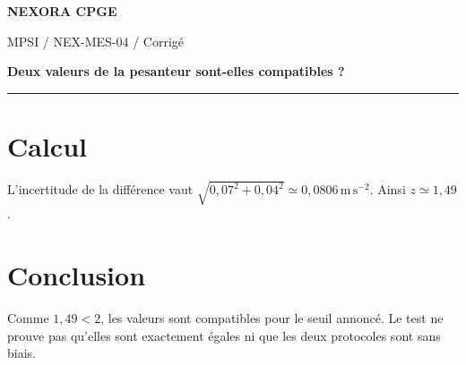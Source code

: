 \documentclass[11pt,a4paper]{article}
\begin{document}
{\small\bfseries\color{nexorablue} NEXORA CPGE}\par
{\small MPSI / NEX-MES-04 / Corrigé}\par
{\LARGE\bfseries Deux valeurs de la pesanteur sont-elles compatibles ?}\par
\vspace{0.25em}\hrule\vspace{0.6em}

\section*{Calcul}
L’incertitude de la différence vaut $\sqrt{0{,}07^2+0{,}04^2}\simeq0{,}0806\,\mathrm{m\,s^{-2}}$. Ainsi $z\simeq1{,}49$.

\section*{Conclusion}
Comme $1{,}49<2$, les valeurs sont compatibles pour le seuil annoncé. Le test ne prouve pas qu’elles sont exactement égales ni que les deux protocoles sont sans biais.
\end{document}

